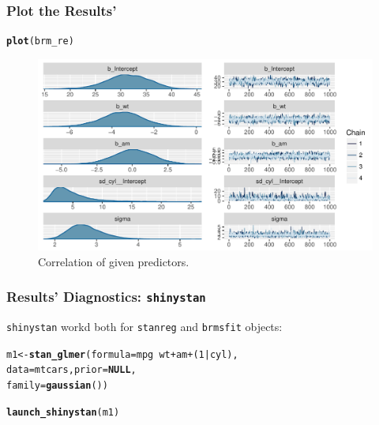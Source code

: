 \documentclass[handout]{beamer}\usepackage[]{graphicx}\usepackage[]{color}
\makeatletter
\def\maxwidth{ %
  \ifdim\Gin@nat@width>\linewidth
    \linewidth
  \else
    \Gin@nat@width
  \fi
}
\newcommand{\hlnum}[1]{\textcolor[rgb]{0.686,0.059,0.569}{#1}}%
\newcommand{\hlopt}[1]{\textcolor[rgb]{0,0,0}{#1}}%
\newcommand{\hlstd}[1]{\textcolor[rgb]{0.345,0.345,0.345}{#1}}%
\newcommand{\hlkwa}[1]{\textcolor[rgb]{0.161,0.373,0.58}{\textbf{#1}}}%
\newcommand{\hlkwb}[1]{\textcolor[rgb]{0.69,0.353,0.396}{#1}}%
\newcommand{\hlkwc}[1]{\textcolor[rgb]{0.333,0.667,0.333}{#1}}%
\newcommand{\hlkwd}[1]{\textcolor[rgb]{0.737,0.353,0.396}{\textbf{#1}}}%
\newenvironment{kframe}{%
 \def\at@end@of@kframe{}%
 \ifinner\ifhmode%
  \def\at@end@of@kframe{\end{minipage}}%
  \begin{minipage}{\columnwidth}%
 \fi\fi%
 \def\FrameCommand##1{\hskip\@totalleftmargin \hskip-\fboxsep
 \colorbox{shadecolor}{##1}\hskip-\fboxsep
     \hskip-\linewidth \hskip-\@totalleftmargin \hskip\columnwidth}%
 \MakeFramed {\advance\hsize-\width
   \@totalleftmargin\z@ \linewidth\hsize
   \@setminipage}}%
 {\par\unskip\endMakeFramed%
 \at@end@of@kframe}
\newenvironment{knitrout}{}{} %
\makeatother
\begin{document}

\begin{frame}[fragile]
\frametitle{Plot the Results' }



\begin{knitrout}
\color{fgcolor}\begin{kframe}
\begin{alltt}
\hlkwd{plot}\hlstd{(brm_re)}
\end{alltt}
\end{kframe}\begin{figure}[H]
\includegraphics[width=\maxwidth]{figure/p2b-1} \caption[Correlation of given predictors]{Correlation of given predictors.}\label{fig:p2b}
\end{figure}


\end{knitrout}

\end{frame}


\begin{frame}[fragile]
\frametitle{Results' Diagnostics: \texttt{shinystan}}
\texttt{shinystan} workd both for \texttt{stanreg} and \texttt{brmsfit} objects:\\

\begin{knitrout}
\color{fgcolor}\begin{kframe}
\begin{alltt}
\hlstd{m1} \hlkwb{<-} \hlkwd{stan_glmer}\hlstd{(}\hlkwc{formula} \hlstd{= mpg} \hlopt{~} \hlstd{wt} \hlopt{+} \hlstd{am} \hlopt{+} \hlstd{(}\hlnum{1}\hlopt{|}\hlstd{cyl),}
                 \hlkwc{data} \hlstd{= mtcars,}  \hlkwc{prior} \hlstd{=} \hlkwa{NULL}\hlstd{,}
                 \hlkwc{family} \hlstd{=} \hlkwd{gaussian}\hlstd{())}

\hlkwd{launch_shinystan}\hlstd{(m1)}
\end{alltt}
\end{kframe}
\end{knitrout}

\end{frame}
\end{document}
